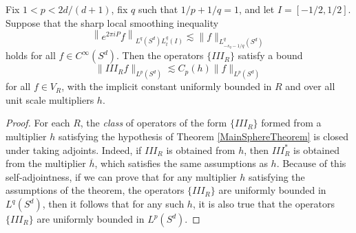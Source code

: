 \begin{theorem}
    Fix $1 < p < 2d/(d+1)$, fix $q$ such that $1/p + 1/q = 1$, and let $I = [-1/2,1/2]$. Suppose that the sharp local smoothing inequality
    \[ \left\| e^{2 \pi i P} f \right\|_{L^q(S^d) L^q_t(I)} \lesssim \| f \|_{L^q_{-s_q-1/q}(S^d)} \]
    holds for all $f \in C^\infty(S^d)$. Then the operators $\{ III_R \}$ satisfy a bound
    \[ \| III_R f \|_{L^p(S^d)} \lesssim C_p(h) \| f \|_{L^p(S^d)} \]
    for all $f \in V_R$, with the implicit constant uniformly bounded in $R$ and over all unit scale multipliers $h$.
\end{theorem}
\begin{proof}
    For each $R$, the \emph{class} of operators of the form $\{ III_R \}$ formed from a multiplier $h$ satisfying the hypothesis of Theorem \ref{MainSphereTheorem} is closed under taking adjoints. Indeed, if $III_R$ is obtained from $h$, then $III_R^*$ is obtained from the multiplier $\overline{h}$, which satisfies the same assumptions as $h$. Because of this self-adjointness, if we can prove that for any multiplier $h$ satisfying the assumptions of the theorem, the operators $\{ III_R \}$ are uniformly bounded in $L^q(S^d)$, then it follows that for any such $h$, it is also true that the operators $\{ III_R \}$ are uniformly bounded in $L^p(S^d)$.


\end{proof}
